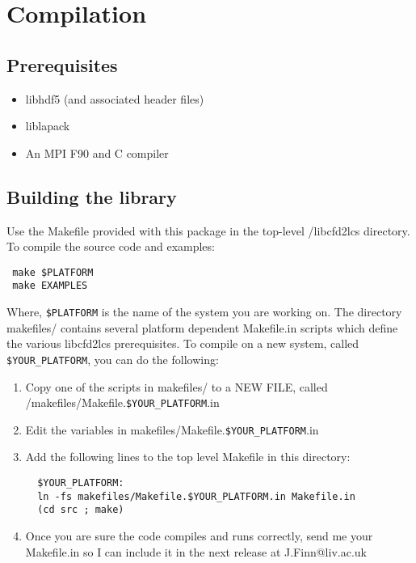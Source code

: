 \documentclass[a4paper,12pt]{article}
\begin{document}
\section{Compilation}
\subsection*{Prerequisites}
\begin{itemize}
 \item libhdf5 (and associated header files)
 \item liblapack
 \item An MPI F90 and C compiler
\end{itemize}

\subsection*{Building the library}
Use the Makefile provided with this package in the top-level /libcfd2lcs directory.  To compile the source code and examples:
\begin{verbatim}
 make $PLATFORM
 make EXAMPLES
\end{verbatim}
Where, \verb|$PLATFORM| is the name of the system you are working on. The directory makefiles/ contains several platform dependent Makefile.in scripts which define the various libcfd2lcs prerequisites.  To compile on a new system, called \verb|$YOUR_PLATFORM|, you can do the following: 
\begin{enumerate}
 \item Copy one of the scripts in makefiles/ to a NEW FILE, called\\ /makefiles/Makefile.\verb|$YOUR_PLATFORM|.in
 \item Edit the variables in makefiles/Makefile.\verb|$YOUR_PLATFORM|.in
 \item Add the following lines to the top level Makefile in this directory:
 \begin{verbatim}
  $YOUR_PLATFORM:
  ln -fs makefiles/Makefile.$YOUR_PLATFORM.in Makefile.in
  (cd src ; make)
 \end{verbatim} 
 \item Once you are sure the code compiles and runs correctly, send me your Makefile.in so I can include it in the next release at J.Finn@liv.ac.uk
\end{enumerate}
\end{document}
